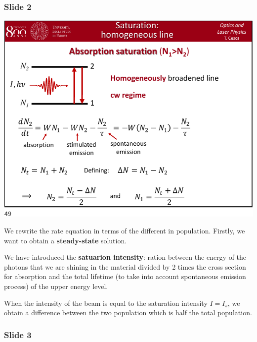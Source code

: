 \documentclass[../main/main.tex]{subfiles}
\begin{document}
\subsubsection*{Slide 2}

\begin{minipage}[]{0.5\linewidth}
\centering
\includegraphics[page=2,width=1\textwidth]{../lessons/pdf_file/10_lecture.pdf}
\end{minipage}
\hspace{0.3cm}\vspace{0.3cm}
\begin{minipage}[c]{0.47\linewidth}

We rewrite the rate equation in terms of the different in population. Firstly, we want to obtain a \textbf{steady-state} solution.

We have introduced the \textbf{satuarion intensity}: ration between the energy of the photons that we are shining in the material divided by 2 times the cross section for absorption and the total lifetime (to take into account spontaneous emission process) of the upper energy level.

When the intensity of the beam is equal to the saturation intensity \( I = I_s \), we obtain a difference between the two population which is half the total population.

\end{minipage}

\subsubsection*{Slide 3}
\end{document}
